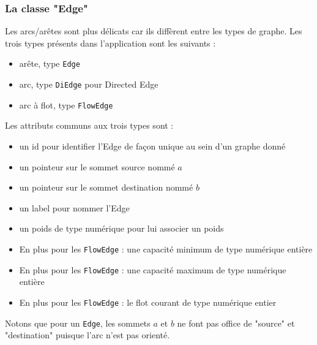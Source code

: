 \documentclass[french]{article}
\begin{document}
			\subsubsection{La classe "Edge"}
			Les arcs/arêtes sont plus délicats car ils diffèrent entre les types de graphe. Les trois types présents dans l'application sont les suivants :
			\begin{itemize}
				\item arête, type \lstinline[basicstyle=\ttfamily\color{blue}]|Edge|
				\item arc, type \lstinline[basicstyle=\ttfamily\color{blue}]|DiEdge| pour Directed Edge
				\item arc à flot, type \lstinline[basicstyle=\ttfamily\color{blue}]|FlowEdge|\\
			\end{itemize}
			
			Les attributs communs aux trois types sont :
			\begin{itemize}
				\item un id pour identifier l'Edge de façon unique au sein d'un graphe donné
				\item un pointeur sur le sommet source nommé $a$
				\item un pointeur sur le sommet destination nommé $b$
				\item un label pour nommer l'Edge
				\item un poids de type numérique pour lui associer un poids
				\item En plus pour les \lstinline[basicstyle=\ttfamily\color{blue}]|FlowEdge| : une capacité minimum de type numérique entière
				\item En plus pour les \lstinline[basicstyle=\ttfamily\color{blue}]|FlowEdge| : une capacité maximum de type numérique entière
				\item En plus pour les \lstinline[basicstyle=\ttfamily\color{blue}]|FlowEdge| : le flot courant de type numérique entier\\
			\end{itemize}
			
			Notons que pour un \lstinline[basicstyle=\ttfamily\color{blue}]|Edge|, les sommets $a$ et $b$ ne font pas office de "source" et "destination" puisque l'arc n'est pas orienté.\\
			
\end{document}
